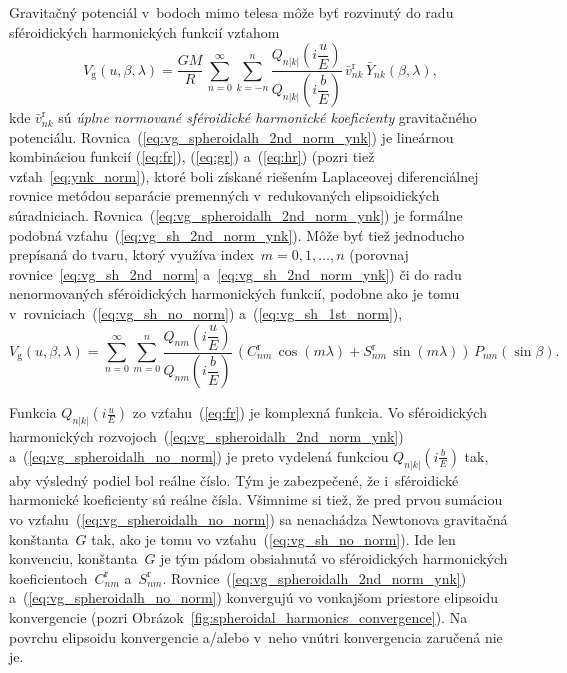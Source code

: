 \documentclass[a4paper, 12pt]{book}
\newcommand{\gidx}{\mathrm g}
\begin{document}
Gravitačný potenciál v~bodoch mimo telesa môže byť rozvinutý do radu 
sféroidických harmonických funkcií vzťahom \parencite{MoritzPhysicalGeodesy}
%
\begin{equation}
\label{eq:vg_spheroidalh_2nd_norm_ynk}
V_\gidx(u, \beta, \lambda) = \frac{GM}{R} \, \sum_{n = 0}^\infty \sum_{k 
= -n}^n \frac{Q_{n|k|}\left( i \dfrac{u}{E} \right)}{Q_{n|k|}\left( 
i \dfrac{b}{E} \right)} \, \bar{v}^{\mathrm{r}}_{nk} \, \bar{Y}_{nk}(\beta, 
\lambda){,}
\end{equation}
%
kde $\bar{v}_{nk}^\mathrm{r}$ sú \emph{úplne normované sféroidické harmonické 
koeficienty} gravitačného potenciálu.  
Rovnica~(\ref{eq:vg_spheroidalh_2nd_norm_ynk}) je lineárnou kombináciou funkcií 
(\ref{eq:fr}), (\ref{eq:gr}) a~(\ref{eq:hr}) (pozri tiež 
vzťah~\ref{eq:ynk_norm}), ktoré boli získané riešením Laplaceovej 
diferenciálnej rovnice metódou separácie premenných v~redukovaných 
elipsoidických súradniciach.  Rovnica~(\ref{eq:vg_spheroidalh_2nd_norm_ynk}) je 
formálne podobná vzťahu~(\ref{eq:vg_sh_2nd_norm_ynk}).  Môže byť tiež 
jednoducho prepísaná do tvaru, ktorý využíva index~$m = 0, 1, \dots, n$ 
(porovnaj rovnice~\ref{eq:vg_sh_2nd_norm} a~\ref{eq:vg_sh_2nd_norm_ynk}) či do 
radu nenormovaných sféroidických harmonických funkcií, podobne ako je tomu 
v~rovniciach~(\ref{eq:vg_sh_no_norm}) a~(\ref{eq:vg_sh_1st_norm}),
%
\begin{equation}
\label{eq:vg_spheroidalh_no_norm}
V_\gidx(u, \beta, \lambda) = \sum_{n = 0}^\infty \sum_{m = 0}^n 
\frac{Q_{nm}\left( i \dfrac{u}{E} \right)}{Q_{nm}\left( i \dfrac{b}{E} \right)} 
\, \left( C^{\mathrm{r}}_{nm} \, \cos(m\lambda) + S^{\mathrm{r}}_{nm} \, 
\sin(m\lambda) \right) \, P_{nm}(\sin\beta){.}
\end{equation}

Funkcia $Q_{n|k|}\left( i \frac{u}{E} \right)$ zo vzťahu~(\ref{eq:fr}) je 
komplexná funkcia.  Vo sféroidických harmonických 
rozvojoch~(\ref{eq:vg_spheroidalh_2nd_norm_ynk}) 
a~(\ref{eq:vg_spheroidalh_no_norm}) je preto vydelená funkciou $Q_{n|k|}\left( 
i \frac{b}{E} \right)$ tak, aby výsledný podiel bol reálne číslo.  Tým je 
zabezpečené, že i~sféroidické harmonické koeficienty sú reálne čísla.  Všimnime 
si tiež, že pred prvou sumáciou vo vzťahu~(\ref{eq:vg_spheroidalh_no_norm}) sa 
nenachádza Newtonova gravitačná konštanta~$G$ tak, ako je tomu vo 
vzťahu~(\ref{eq:vg_sh_no_norm}).  Ide len konvenciu, konštanta~$G$ je tým pádom 
obsiahnutá vo sféroidických harmonických koeficientoch~$C_{nm}^\mathrm{r}$ 
a~$S_{nm}^\mathrm{r}$.  Rovnice~(\ref{eq:vg_spheroidalh_2nd_norm_ynk}) 
a~(\ref{eq:vg_spheroidalh_no_norm}) konvergujú vo vonkajšom priestore elipsoidu 
konvergencie (pozri Obrázok~\ref{fig:spheroidal_harmonics_convergence}).  Na 
povrchu elipsoidu konvergencie a/alebo v~neho vnútri konvergencia zaručená nie 
je.
\end{document}
